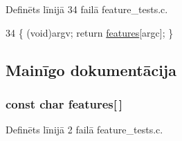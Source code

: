 Definēts līnijā 34 failā feature\+\_\+tests.\+c.


\begin{DoxyCode}
34 \{ (void)argv; \textcolor{keywordflow}{return} \hyperlink{build_2_c_make_files_2feature__tests_8c_a1582568e32f689337602a16bf8a5bff0}{features}[argc]; \}
\end{DoxyCode}


\subsection{Mainīgo dokumentācija}
\subsubsection[{\texorpdfstring{features}{features}}]{\setlength{\rightskip}{0pt plus 5cm}const char features\mbox{[}$\,$\mbox{]}}\hypertarget{cmake-build-release_2_c_make_files_2feature__tests_8c_a1582568e32f689337602a16bf8a5bff0}{}\label{cmake-build-release_2_c_make_files_2feature__tests_8c_a1582568e32f689337602a16bf8a5bff0}


Definēts līnijā 2 failā feature\+\_\+tests.\+c.

